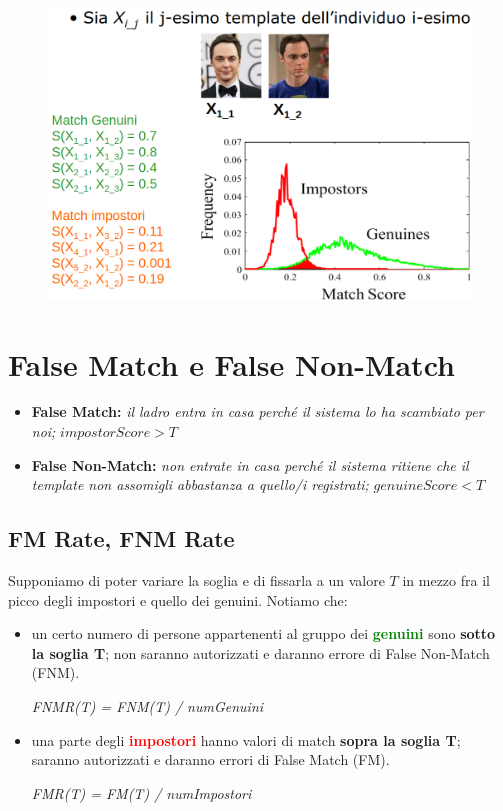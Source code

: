 \documentclass{report}
\begin{document}
\begin{figure}[ht]
    \centering
    \includegraphics[width=1\linewidth]{images/distr-matchscore.png}
\end{figure}

\section{False Match e False Non-Match}

\begin{itemize}
    \item \textbf{False Match:} \textit{il ladro entra in casa perché il sistema lo 
    ha scambiato per noi;} \textbf{$impostorScore > T$}
    \item \textbf{False Non-Match:} \textit{non entrate in casa perché il sistema ritiene che il template non assomigli
    abbastanza a quello/i registrati;} \textbf{$genuineScore < T$}
\end{itemize}

\subsection{FM Rate, FNM Rate}

Supponiamo di poter variare la soglia e di fissarla a un valore $T$ in mezzo fra il picco
degli impostori e quello dei genuini. Notiamo che:
\begin{itemize}
    \item un certo numero di persone appartenenti al gruppo dei \textbf{\textcolor{green}{genuini}} 
    sono \textbf{sotto la soglia T}; non saranno autorizzati e daranno errore di
    False Non-Match (FNM).

    \textit{FNMR(T) = FNM(T) / numGenuini}
    \item una parte degli \textbf{\textcolor{red}{impostori}} hanno valori di match
    \textbf{sopra la soglia T}; saranno autorizzati e daranno errori di False Match (FM).

    \textit{FMR(T) = FM(T) / numImpostori}
\end{itemize}
\end{document}

